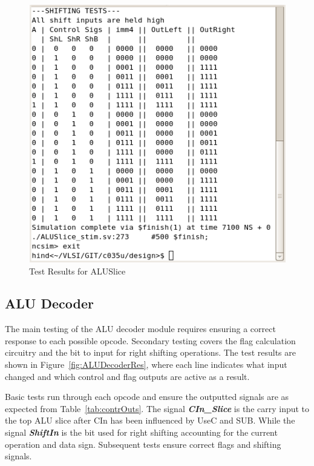 \begin{figure}[h]
	\includegraphics[scale=0.72]{results/ALUSliceB.png}
	\caption{Test Results for ALUSlice}
	\label{fig:ALUSliceRes}
\end{figure}

\subsection{ALU Decoder}
The main testing of the ALU decoder module requires ensuring a correct response to each possible opcode. Secondary testing covers the flag calculation circuitry and the bit to input for right shifting operations. The test results are shown in Figure~\ref{fig:ALUDecoderRes}, where each line indicates what input changed and which control and flag outputs are active as a result. 

Basic tests run through each opcode and ensure the outputted signals are as expected from Table~\ref{tab:contrOuts}. The signal {\bf \it CIn\_Slice} is the carry input to the top ALU slice after CIn has been influenced by UseC and SUB. While the signal {\bf \it ShiftIn} is the bit used for right shifting accounting for the current operation and data sign. Subsequent tests ensure correct flags and shifting signals. 

